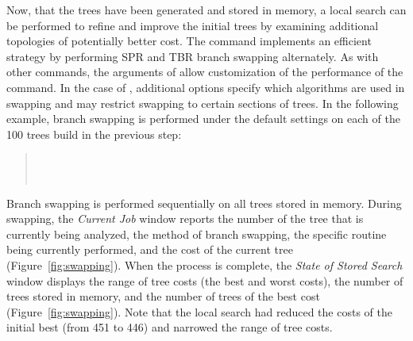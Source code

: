 Now, that the trees have been generated and stored in memory, a local search can be performed to refine and improve the initial trees by examining additional topologies of potentially better cost.  The command  implements an efficient strategy by performing SPR and TBR branch swapping alternately. As with other commands, the arguments of  allow customization of the performance of the command. In the case of , additional options specify which algorithms are used in swapping and may restrict swapping to certain sections of trees. In the following example, branch swapping is performed under the default settings on each of the 100 trees build in the previous step:

\begin{quote}
 	\\
 	\\
\end{quote}

Branch swapping is performed sequentially on all trees stored in memory. During swapping, the \emph{Current Job} window reports the number of the tree that is currently being analyzed, the method of branch swapping, the specific routine being currently performed, and the cost of the current tree (Figure~\ref{fig:swapping}). When the process is complete, the \emph{State of Stored Search} window displays the range of tree costs (the best and worst costs), the number of trees stored in memory, and the number of trees of the best cost (Figure~\ref{fig:swapping}). Note that the local search had reduced the costs of the initial best (from 451 to 446) and narrowed the range of tree costs.

